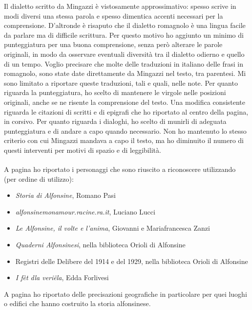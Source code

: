 \newpage
\noindent Il dialetto scritto da Mingazzi è vistosamente approssimativo: spesso scrive in modi diversi una stessa parola e spesso dimentica accenti necessari per la comprensione. D'altronde è risaputo che il dialetto romagnolo è una lingua facile da parlare ma di difficile scrittura. Per questo motivo ho aggiunto un minimo di punteggiatura per una buona comprensione, senza però alterare le parole originali, in modo da osservare eventuali diversità tra il dialetto odierno e quello di un tempo. Voglio precisare che molte delle traduzioni in italiano delle frasi in romagnolo, sono state date direttamente da Mingazzi nel testo, tra parentesi. Mi sono limitato a riportare queste traduzioni, tali e quali, nelle note. Per quanto riguarda la punteggiatura, ho scelto di mantenere le virgole nelle posizioni originali, anche se ne risente la comprensione del testo. Una modifica consistente riguarda le citazioni di scritti e di epigrafi che ho riportato al centro della pagina, in corsivo. Per quanto riguarda i dialoghi, ho scelto di munirli di adeguata punteggiatura e di andare a capo quando necessario. Non ho mantenuto lo stesso criterio con cui Mingazzi mandava a capo il testo, ma ho diminuito il numero di questi interventi per motivi di spazio e di leggibilità.	\\\\
\noindent A pagina \pageref{Personaggi} ho riportato i personaggi che sono riuscito a riconoscere utilizzando (per ordine di utilizzo):
\begin{itemize}
\item{\emph{Storia di Alfonsine}, Romano Pasi}
\item{\emph{alfonsinemonamour.racine.ra.it}, Luciano Lucci}
\item{\emph{Le Alfonsine, il volte e l'anima}, Giovanni e Mariafrancesca Zanzi}
\item{\emph{Quaderni Alfonsinesi}, nella biblioteca Orioli di Alfonsine}
\item{Registri delle Delibere del 1914 e del 1929, nella biblioteca Orioli di Alfonsine}
\item{\emph{I fèt dla veriëla}, Edda Forlivesi}
\end{itemize}

\noindent A pagina \pageref{Luoghi} ho riportato delle precisazioni geografiche in particolare per quei luoghi o edifici che hanno costruito la storia alfonsinese.